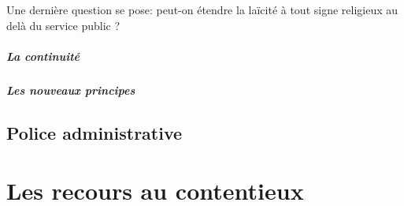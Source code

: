 \documentclass[10pt, a4paper, openany]{book}
\begin{document}
Une dernière question se pose: peut-on étendre la laïcité à tout signe religieux au delà du service public ?






\subsubsection{La continuité}



\subsubsection{Les nouveaux principes}







\chapter{Police administrative}


\part{Les recours au contentieux}
\end{document}
